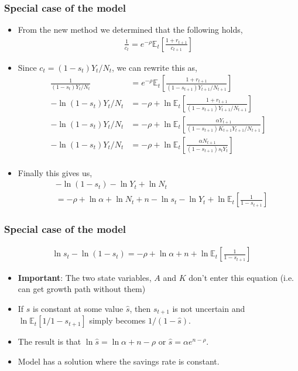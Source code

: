 \documentclass[10pt, handout]{beamer} %
\begin{document}
\begin{frame}
\frametitle{Special case of the model}
\small
\begin{itemize}[<+->]
\item From the new method we determined that the following holds,
\begin{align*}
\frac{1}{c_{t}} = e^{-\rho}\mathbb{E}_{t}\left[\frac{1+r_{t+1}}{c_{t+1}}\right]
\end{align*}
\item Since $c_{t} = (1 - s_{t})Y_{t}/N_{t}$, we can rewrite this as,
\begin{align*}
\frac{1}{(1 - s_{t})Y_{t}/N_{t}} &= e^{-\rho}\mathbb{E}_{t}\left[\frac{1+r_{t+1}}{(1 - s_{t+1})Y_{t+1}/N_{t+1}}\right] \\
-\ln{(1 - s_{t})Y_{t}/N_{t}} &= {-\rho} + \ln\mathbb{E}_{t}\left[\frac{1+r_{t+1}}{(1 - s_{t+1})Y_{t+1}/N_{t+1}}\right] \\
-\ln{(1 - s_{t})Y_{t}/N_{t}} &= {-\rho} + \ln\mathbb{E}_{t}\left[\frac{\alpha{Y_{t+1}}}{(1 - s_{t+1})K_{t+1}Y_{t+1}/N_{t+1}}\right] \\
-\ln{(1 - s_{t})Y_{t}/N_{t}} &= {-\rho} + \ln\mathbb{E}_{t}\left[\frac{{\alpha}N_{t+1}}{(1 - s_{t+1})s_{t}Y_{t}}\right] \\
\end{align*}
\item Finally this gives us,
\begin{align*}
&-\ln(1-s_{t}) - \ln{Y_{t}} + \ln{N_{t}} \\
&= -\rho + \ln\alpha + \ln{N_{t}} + n - \ln{s_{t}} - \ln{Y_{t}} + \ln{\mathbb{E}_{t}}\left[\frac{1}{1-s_{t+1}}\right]
\end{align*}
\end{itemize}
\end{frame}

\begin{frame}
\frametitle{Special case of the model}
\begin{align*}
\ln{s_{t}}-\ln(1-s_{t}) = -\rho + \ln\alpha + n + \ln{\mathbb{E}_{t}}\left[\frac{1}{1-s_{t+1}}\right]
\end{align*}
\begin{itemize}[<+->]
\item \textbf{Important}: The two state variables, $A$ and $K$ don't enter this equation (i.e. can get growth path without them)
\item If $s$ is constant at some value $\hat{s}$, then $s_{t+1}$ is not uncertain and $\ln{\mathbb{E}_{t}}\left[{1}/{1-s_{t+1}}\right]$ simply becomes ${1}/{(1-\hat{s})}$.
\vspace{4mm}
\item The result is that $\ln{\hat{s}} = \ln{\alpha} + n - \rho$ or $\hat{s} = \alpha{e^{n-\rho}}$.
\item Model has a solution where the savings rate is constant.
\end{itemize}
\end{frame}
\end{document}
